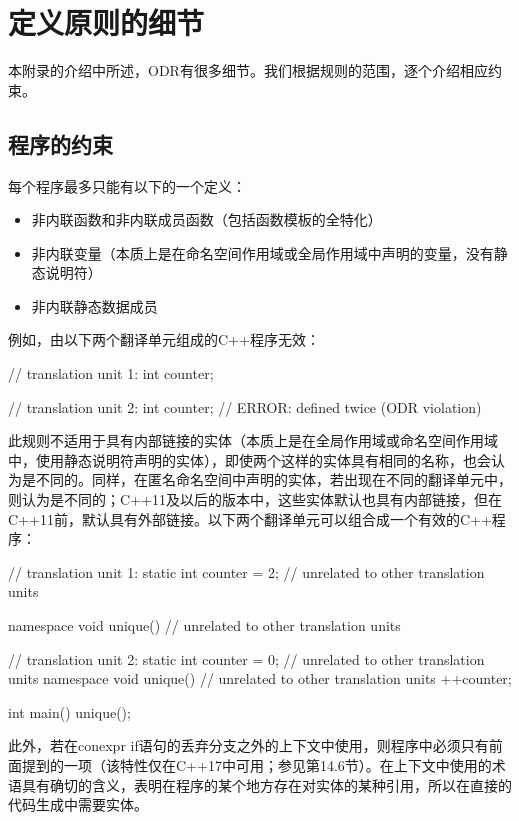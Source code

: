\section{定义原则的细节}

本附录的介绍中所述，ODR有很多细节。我们根据规则的范围，逐个介绍相应约束。

\subsection{程序的约束}

每个程序最多只能有以下的一个定义：

\begin{itemize}
\item 
非内联函数和非内联成员函数（包括函数模板的全特化）

\item 
非内联变量（本质上是在命名空间作用域或全局作用域中声明的变量，没有静态说明符）

\item 
非内联静态数据成员
\end{itemize}

例如，由以下两个翻译单元组成的C++程序无效：

\begin{cpp}
// translation unit 1:
int counter;

// translation unit 2:
int counter; // ERROR: defined twice (ODR violation)
\end{cpp}

此规则不适用于具有内部链接的实体（本质上是在全局作用域或命名空间作用域中，使用静态说明符声明的实体），即使两个这样的实体具有相同的名称，也会认为是不同的。同样，在匿名命名空间中声明的实体，若出现在不同的翻译单元中，则认为是不同的；C++11及以后的版本中，这些实体默认也具有内部链接，但在C++11前，默认具有外部链接。以下两个翻译单元可以组合成一个有效的C++程序：

\begin{cpp}
// translation unit 1:
static int counter = 2; // unrelated to other translation units

namespace {
	void unique() // unrelated to other translation units
	{ }
}

// translation unit 2:
static int counter = 0; // unrelated to other translation units
namespace {
	void unique() // unrelated to other translation units
	{
		++counter;
	}
}

int main() {
	unique();
}
\end{cpp}

此外，若在conexpr if语句的丢弃分支之外的上下文中使用，则程序中必须只有前面提到的一项（该特性仅在C++17中可用；参见第14.6节）。在上下文中使用的术语具有确切的含义，表明在程序的某个地方存在对实体的某种引用，所以在直接的代码生成中需要实体。

